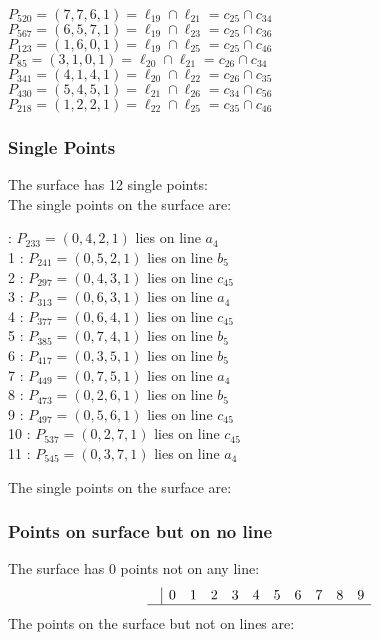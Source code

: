 \documentclass{article}
\begin{document}
{\begin{multicols}{2}
$P_{520} = ( 7, 7, 6, 1 ) = \ell_{19} \cap \ell_{21}  = c_{25} \cap c_{34}$\\
$P_{567} = ( 6, 5, 7, 1 ) = \ell_{19} \cap \ell_{23}  = c_{25} \cap c_{36}$\\
$P_{123} = ( 1, 6, 0, 1 ) = \ell_{19} \cap \ell_{25}  = c_{25} \cap c_{46}$\\
$P_{85} = ( 3, 1, 0, 1 ) = \ell_{20} \cap \ell_{21}  = c_{26} \cap c_{34}$\\
$P_{341} = ( 4, 1, 4, 1 ) = \ell_{20} \cap \ell_{22}  = c_{26} \cap c_{35}$\\
$P_{430} = ( 5, 4, 5, 1 ) = \ell_{21} \cap \ell_{26}  = c_{34} \cap c_{56}$\\
$P_{218} = ( 1, 2, 2, 1 ) = \ell_{22} \cap \ell_{25}  = c_{35} \cap c_{46}$\\
\end{multicols}
\subsubsection*{Single Points}
The surface has 12 single points:\\
The single points on the surface are:\\
\begin{multicols}{2}
 : $P_{233}=( 0, 4, 2, 1 )$ lies on line $a_{4}$\\
1 : $P_{241}=( 0, 5, 2, 1 )$ lies on line $b_{5}$\\
2 : $P_{297}=( 0, 4, 3, 1 )$ lies on line $c_{45}$\\
3 : $P_{313}=( 0, 6, 3, 1 )$ lies on line $a_{4}$\\
4 : $P_{377}=( 0, 6, 4, 1 )$ lies on line $c_{45}$\\
5 : $P_{385}=( 0, 7, 4, 1 )$ lies on line $b_{5}$\\
6 : $P_{417}=( 0, 3, 5, 1 )$ lies on line $b_{5}$\\
7 : $P_{449}=( 0, 7, 5, 1 )$ lies on line $a_{4}$\\
8 : $P_{473}=( 0, 2, 6, 1 )$ lies on line $b_{5}$\\
9 : $P_{497}=( 0, 5, 6, 1 )$ lies on line $c_{45}$\\
10 : $P_{537}=( 0, 2, 7, 1 )$ lies on line $c_{45}$\\
11 : $P_{545}=( 0, 3, 7, 1 )$ lies on line $a_{4}$\\
\end{multicols}
The single points on the surface are:\\
\subsubsection*{Points on surface but on no line}
The surface has 0 points not on any line:\\
$$
\begin{array}{r|*{10}{r}}
 & 0 & 1 & 2 & 3 & 4 & 5 & 6 & 7 & 8 & 9\\
\hline
\end{array}
$$
The points on the surface but not on lines are:\\
\begin{multicols}{2}
\noindent
\end{multicols}
}
\end{document}
